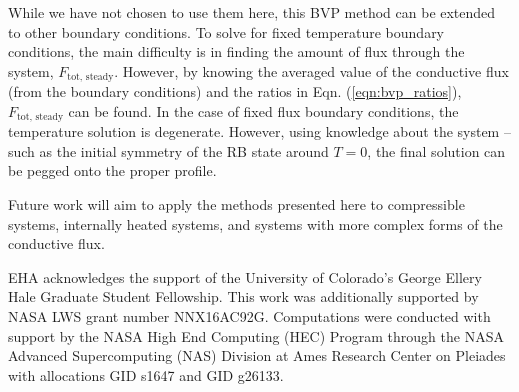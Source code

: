 \documentclass[aps, pre, onecolumn, nofootinbib, notitlepage, groupedaddress, amsfonts, amssymb, amsmath, longbibliography]{revtex4-1}
\begin{document}
While we have not chosen to use them here, this BVP method can be extended to other boundary conditions.  
To solve for fixed temperature boundary conditions, the 
main difficulty is in finding the amount of flux through the system, $F_{\text{tot, steady}}$.
However, by knowing the averaged value of the conductive flux (from the boundary conditions)
and the ratios in Eqn. (\ref{eqn:bvp_ratios}), $F_{\text{tot, steady}}$ can be found.
In the case of
fixed flux boundary conditions, the temperature solution is degenerate.
However, using knowledge about the system -- such as the initial symmetry of the
RB state around $T = 0$, the final solution can be pegged onto the proper profile.

Future work will aim to apply the methods presented here to compressible systems,
internally heated systems, and systems with more complex forms of the conductive flux.


\begin{acknowledgments}
EHA acknowledges the support of the University of Colorado's George 
Ellery Hale Graduate Student Fellowship.
This work was additionally supported by  NASA LWS grant number NNX16AC92G.  
Computations were conducted 
with support by the NASA High End Computing (HEC) Program through the NASA 
Advanced Supercomputing (NAS) Division at Ames Research Center on Pleiades
with allocations GID s1647 and GID g26133.
\end{acknowledgments}


\appendix
\end{document}
